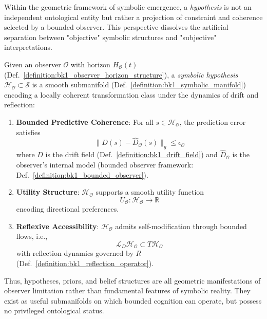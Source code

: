 \begin{scholium}
\label{scholium:bk1_hypotheses_as_submanifolds}
Within the geometric framework of symbolic emergence, a \emph{hypothesis} is not an independent ontological entity but rather a projection of constraint and coherence selected by a bounded observer. This perspective dissolves the artificial separation between "objective" symbolic structures and "subjective" interpretations.

\begin{definition}
\label{definition:bk1_symbolic_hypothesis}
Given an observer $\mathcal{O}$ with horizon $H_\mathcal{O}(t)$ (Def.~\ref{definition:bk1_observer_horizon_structure}), a \emph{symbolic hypothesis} $\mathcal{H}_\mathcal{O} \subset \mathcal{S}$ is a smooth submanifold (Def.~\ref{definition:bk1_symbolic_manifold}) encoding a locally coherent transformation class under the dynamics of drift and reflection:
\begin{enumerate}
    \item \textbf{Bounded Predictive Coherence}: For all \( s \in \mathcal{H}_\mathcal{O} \), the prediction error satisfies 
    \[
    \| D(s) - \hat{D}_\mathcal{O}(s) \|_g \leq \epsilon_\mathcal{O}
    \]
    where \( D \) is the drift field (Def.~\ref{definition:bk1_drift_field}) and \( \hat{D}_\mathcal{O} \) is the observer's internal model (bounded observer framework: Def.~\ref{definition:bk1_bounded_observer}).
    
    \item \textbf{Utility Structure}: \( \mathcal{H}_\mathcal{O} \) supports a smooth utility function 
    \[
    U_\mathcal{O}: \mathcal{H}_\mathcal{O} \to \mathbb{R}
    \]
    encoding directional preferences.

    \item \textbf{Reflexive Accessibility}: \( \mathcal{H}_\mathcal{O} \) admits self-modification through bounded flows, i.e., 
    \[
    \mathcal{L}_D \mathcal{H}_\mathcal{O} \subset T\mathcal{H}_\mathcal{O}
    \]
    with reflection dynamics governed by \( R \) (Def.~\ref{definition:bk1_reflection_operator}).
\end{enumerate}
\end{definition}

Thus, hypotheses, priors, and belief structures are all geometric manifestations of observer limitation rather than fundamental features of symbolic reality. They exist as useful submanifolds on which bounded cognition can operate, but possess no privileged ontological status.
\end{scholium}

